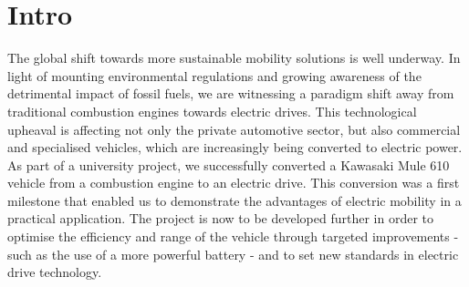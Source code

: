 \chapter{Intro}
\label{cha:Problemstellung, Ziel und Vorgehensweise der Arbeit}

The global shift towards more sustainable mobility solutions is well underway. In light of mounting environmental regulations and growing awareness of the detrimental impact of fossil fuels, we are witnessing a paradigm shift away from traditional combustion engines towards electric drives. This technological upheaval is affecting not only the private automotive sector, but also commercial and specialised vehicles, which are increasingly being converted to electric power.\autocite{Pischinger2023}
As part of a university project, we successfully converted a Kawasaki Mule 610 vehicle from a combustion engine to an electric drive. This conversion was a first milestone that enabled us to demonstrate the advantages of electric mobility in a practical application. The project is now to be developed further in order to optimise the efficiency and range of the vehicle through targeted improvements - such as the use of a more powerful battery - and to set new standards in electric drive technology.
\clearpage
